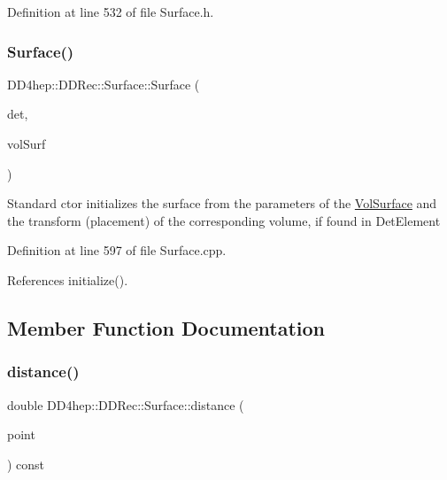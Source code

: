 Definition at line 532 of file Surface.\+h.

\hypertarget{class_d_d4hep_1_1_d_d_rec_1_1_surface_a1a4cca5bac129f897331f1df355c75d0}{}\label{class_d_d4hep_1_1_d_d_rec_1_1_surface_a1a4cca5bac129f897331f1df355c75d0} 
\subsubsection{\texorpdfstring{Surface()}{Surface()}\hspace{0.1cm}{\footnotesize\ttfamily [2/2]}}
{\footnotesize\ttfamily D\+D4hep\+::\+D\+D\+Rec\+::\+Surface\+::\+Surface (\begin{DoxyParamCaption}\item[{\hyperlink{class_d_d4hep_1_1_geometry_1_1_det_element}{Geometry\+::\+Det\+Element}}]{det,  }\item[{\hyperlink{class_d_d4hep_1_1_d_d_rec_1_1_vol_surface}{Vol\+Surface}}]{vol\+Surf }\end{DoxyParamCaption})}

Standard c\textquotesingle{}tor initializes the surface from the parameters of the \hyperlink{class_d_d4hep_1_1_d_d_rec_1_1_vol_surface}{Vol\+Surface} and the transform (placement) of the corresponding volume, if found in Det\+Element 

Definition at line 597 of file Surface.\+cpp.



References initialize().



\subsection{Member Function Documentation}
\hypertarget{class_d_d4hep_1_1_d_d_rec_1_1_surface_ae673205d84823da5118cc1ae4a3403fb}{}\label{class_d_d4hep_1_1_d_d_rec_1_1_surface_ae673205d84823da5118cc1ae4a3403fb} 
\subsubsection{\texorpdfstring{distance()}{distance()}}
{\footnotesize\ttfamily double D\+D4hep\+::\+D\+D\+Rec\+::\+Surface\+::distance (\begin{DoxyParamCaption}\item[{const \hyperlink{class_d_d_surfaces_1_1_vector3_d}{Vector3D} \&}]{point }\end{DoxyParamCaption}) const\hspace{0.3cm}{\ttfamily [virtual]}}

